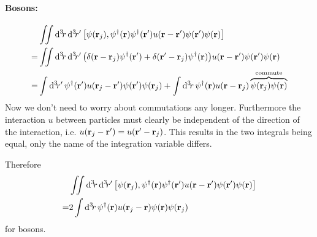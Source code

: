 \documentclass[11pt,letter, swedish, english
]{article}
\begin{document}
\paragraph{Bosons:} 
\begin{equation}
\begin{aligned}
&\iint\rd^3\!r\,\rd^3\!r'\,
\comm{\psi(\vb{r}_j)}{
\psi^\dagger(\vb{r})\psi^\dagger(\vb{r}')
u(\vb{r}-\vb{r}')\psi(\vb{r}')\psi(\vb{r})}\\
=&\iint\rd^3\!r\,\rd^3\!r'\,
\qty(
\delta(\vb{r}-\vb{r}_j) \psi^\dagger(\vb{r}')
+\delta(\vb{r}'-\vb{r}_j)\psi^\dagger(\vb{r})
)
u(\vb{r}-\vb{r}')\psi(\vb{r}')\psi(\vb{r})\\
=&\int\rd^3\!r'\,
\psi^\dagger(\vb{r}')u(\vb{r}_j-\vb{r}')\psi(\vb{r}')\psi(\vb{r}_j)
+\int\rd^3\!r\,
\psi^\dagger(\vb{r})u(\vb{r}-\vb{r}_j)
\commute{\psi(\vb{r}_j)\psi(\vb{r})}
\end{aligned}
\end{equation}
Now we don't need to worry about commutations any longer.
Furthermore the interaction $u$ between particles must clearly be
independent of the direction of the interaction,
i.e. $u(\vb{r}_j-\vb{r}')=u(\vb{r}'-\vb{r}_j)$. This results in the
two integrals being equal, only the name of the integration variable
differs. 

Therefore
\begin{equation}\label{eq:4_comm_ii_bose}
\begin{aligned}
&\iint\rd^3\!r\,\rd^3\!r'\,
\comm{\psi(\vb{r}_j)}{
\psi^\dagger(\vb{r})\psi^\dagger(\vb{r}')
u(\vb{r}-\vb{r}')\psi(\vb{r}')\psi(\vb{r})}\\
=&2\int\rd^3\!r\,
\psi^\dagger(\vb{r})u(\vb{r}_j-\vb{r})\psi(\vb{r})\psi(\vb{r}_j)
\end{aligned}
\end{equation}
for bosons.
\end{document}
